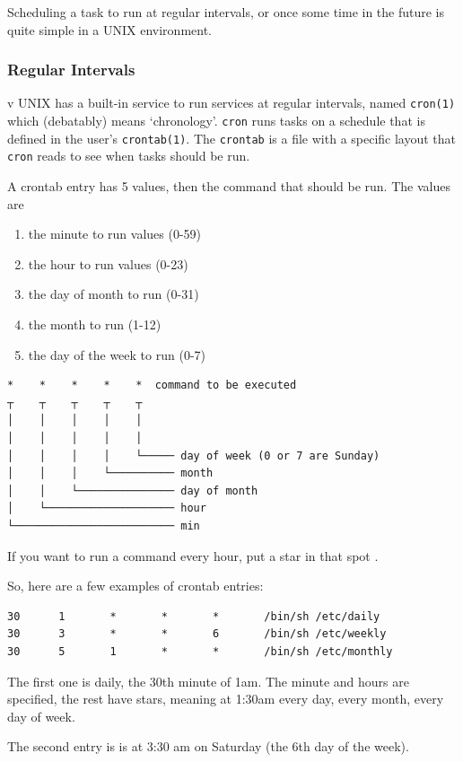 Scheduling a task to run at regular intervals, or once some time in the future 
is quite simple in a UNIX environment.

\subsubsection{Regular Intervals}v
UNIX has a built-in service to run services at regular intervals, named {\tt cron(1)}
which (debatably) means `chronology'. {\tt cron} runs tasks on a schedule that is
defined in the user's {\tt crontab(1)}. The {\tt crontab} is a file with 
a specific layout that {\tt cron} reads to see when tasks should be run.

A crontab entry has 5 values, then the command that should be run. 
The  values are 
\begin{enumerate}
    \item the minute to run values (0-59)
    \item the hour to run values (0-23)
    \item the day of month to run (0-31)
    \item the month to run (1-12)
    \item the day of the week to run (0-7)
\end{enumerate}

\begin{verbatim}
*    *    *    *    *  command to be executed
┬    ┬    ┬    ┬    ┬
│    │    │    │    │
│    │    │    │    │
│    │    │    │    └───── day of week (0 or 7 are Sunday)
│    │    │    └────────── month
│    │    └─────────────── day of month
│    └──────────────────── hour
└───────────────────────── min
\end{verbatim}

If you want to run a command every hour, put a star in that spot {\tt *}.

So, here are a few examples of crontab entries:

\begin{verbatim}
30      1       *       *       *       /bin/sh /etc/daily
30      3       *       *       6       /bin/sh /etc/weekly
30      5       1       *       *       /bin/sh /etc/monthly
\end{verbatim}

The first one is daily, the 30th minute of 1am. The
minute and hours are specified, the rest have stars, meaning at 1:30am 
every day, every month, every day of week.

The second entry is is at 3:30 am on Saturday (the 6th day of the week).

